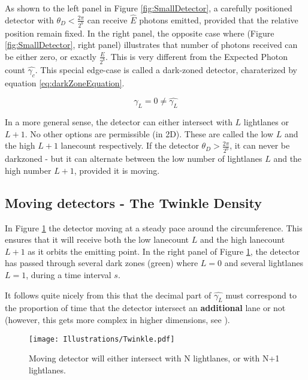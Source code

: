 \documentclass[notitlepage]{article}
\begin{document}
As shown to the left panel in Figure \ref{fig:SmallDetector}, a carefully positioned detector with $ \theta_D < \frac{2 \pi}{ 2^b} $ can receive $\hat{E}$ photons emitted, provided that the relative position remain fixed. In the right panel, the opposite case where   (Figure \ref{fig:SmallDetector}, right panel) illustrates that number of photons received can be either zero, or exactly $\frac{E}{2^b}$.  This is very different from the Expected Photon count $\hat{\gamma_c}$. This special edge-case is called a dark-zoned detector, charaterized by equation \ref{eq:darkZoneEquation}.

\begin{equation}
 \gamma_{L} = 0  \neq \hat{\gamma_L}
 \label{eq:darkZoneEquation}
\end{equation}

In a more general sense, the detector can either intersect with $L$ lightlanes or $L+1$. No other options are permissible (in 2D). These are called the low $L$ and the high $L +1$ lanecount respectively. If the detector $\theta_D > \frac{2\pi}{2^b}$, it can never be darkzoned - but it can alternate between the low number of lightlanes $L$ and the high number $L+1$, provided it is moving.

\subsection{Moving detectors - The Twinkle Density}
In Figure \ref{fig:MovingDetector} the detector  moving at a steady pace around the circumference. This ensures that it will receive both the low lanecount $L$ and the high lanecount $L+1$ as it orbits the emitting point. In the right panel of Figure \ref{fig:MovingDetector}, the detector has passed through several dark zones (green) where $L = 0$ and several lightlanes $L =1$, during a time interval $s$. 

It follows quite nicely from this that the decimal part of $\hat{\gamma_L}$ must correspond to the proportion of  time that the detector intersect an \textbf{additional} lane or not (however, this gets more complex in higher dimensions, see \cite{RhadamantysA3}). 

\begin{figure}[!ht]
  \centering

 \texttt{[image: Illustrations/Twinkle.pdf]}
  \caption{Moving detector will either intersect with N lightlanes, or with N+1 lightlanes. }
    \label{fig:MovingDetector}
\end{figure}
\end{document}
